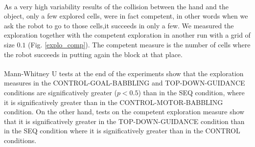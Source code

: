 \documentclass[12pt]{article}
\begin{document}
		\paragraph{}
		As a very high variability results of the collision between the hand and the object, only a few explored cells, were in fact competent, in other words
		when we ask the robot to go to those cells,it succeeds in only a few.
		We measured the exploration together with the competent exploration in another run with a grid of size $0.1$ (Fig. \ref{explo_comp}).
		The competent measure is the number of cells where the robot succeeds in putting again the block at that place.
		
		\paragraph{}
		Mann-Whitney U tests at the end of the experiments show that the exploration measures in the CONTROL-GOAL-BABBLING and TOP-DOWN-GUIDANCE conditions
		are significatively greater ($p<0.5$) than in the SEQ condition, where it is significatively greater than in the CONTROL-MOTOR-BABBLING condition.
		On the other hand, tests on the competent exploration measure show that it is significatively greater in the TOP-DOWN-GUIDANCE condition than in 
		the SEQ condition where it is significatively greater than in the CONTROL conditions.
\end{document}

